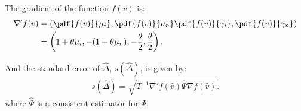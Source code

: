 \documentclass[12pt,oneside,a4paper]{article}
\begin{document}
The gradient of the function $f(v)$ is:
\begin{align*}
\nabla' f(v) &=
\left( 
\pdf{f(v)}{\mu_{i}},
\pdf{f(v)}{\mu_{n}}
\pdf{f(v)}{\gamma_{i}},
\pdf{f(v)}{\gamma_{n}}
\right) \\
&= \left( 1 + \theta \mu_{i}, -(1 + \theta \mu_{n}), -\frac{\theta}{2}, \frac{\theta}{2}  \right).
\end{align*}

And the standard error of $\hat{\Delta}$, $s(\hat{\Delta})$, is given by:
\begin{align*}
	s(\hat{\Delta}) = \sqrt{T^{-1} \nabla'f(\hat{v}) \hat{\Psi} \nabla f(\hat{v})}.
\end{align*}
where $\hat{\Psi}$ is a consistent estimator for $\Psi$.


\clearpage
\renewcommand\bibname{REFERENCES} 


\end{document}
